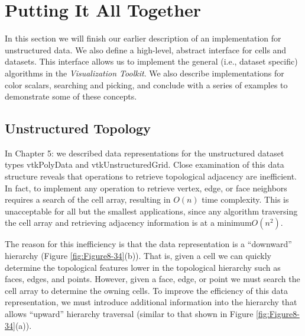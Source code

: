 \section{Putting It All Together}

In this section we will finish our earlier description of an implementation for unstructured data. We also define a high-level, abstract interface for cells and datasets. This interface allows us to implement the general (i.e., dataset specific) algorithms in the \emph{Visualization Toolkit}. We also describe
implementations for color scalars, searching and picking, and conclude with a series of examples to demonstrate some of these concepts.

\subsection{Unstructured Topology}

In Chapter 5:  we described data representations for the unstructured dataset types vtkPolyData and vtkUnstructuredGrid. Close examination of this data structure reveals that operations to retrieve topological adjacency are inefficient. In fact, to implement any operation to retrieve vertex, edge, or face neighbors requires a search of the cell array, resulting in $O(n)$ time complexity. This is unacceptable for all but the smallest applications, since any algorithm traversing the cell array and retrieving adjacency information is at a minimum$ O(n^2)$.

The reason for this inefficiency is that the data representation is a ``downward'' hierarchy (Figure \ref{fig:Figure8-34}(b)). That is, given a cell we can quickly determine the topological features lower in the topological hierarchy such as faces, edges, and points. However, given a face, edge, or point we must search the cell array to determine the owning cells. To improve the efficiency of this data representation, we must introduce additional information into the hierarchy that allows ``upward'' hierarchy traversal (similar to that shown in Figure \ref{fig:Figure8-34}(a)).


